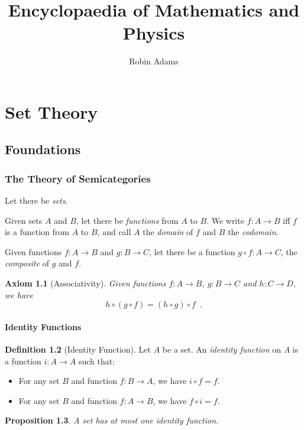 \documentclass{book}
\title{Encyclopaedia of Mathematics and Physics}
\author{Robin Adams}
\date{}
\newtheorem{prop}{Proposition}[chapter]
\newtheorem{ax}[prop]{Axiom}
\theoremstyle{definition}
\newtheorem{df}[prop]{Definition}
\begin{document}
\maketitle
\tableofcontents

\part{Set Theory}

\chapter{Foundations}

\section{The Theory of Semicategories}

Let there be \emph{sets}.

Given sets $A$ and $B$, let there be \emph{functions} from $A$ to $B$. We write $f : A \rightarrow B$ iff $f$ is a function from $A$ to $B$, and call $A$ the \emph{domain} of $f$ and $B$ the \emph{codomain}.

Given functions $f : A \rightarrow B$ and $g : B \rightarrow C$, let there be a function $g \circ f : A \rightarrow C$, the \emph{composite} of $g$ and $f$.

\begin{ax}[Associativity]
Given functions $f : A \rightarrow B$, $g : B \rightarrow C$ and $h : C \rightarrow D$, we have
\[ h \circ (g \circ f) = (h \circ g) \circ f \enspace . \]
\end{ax}

\subsection{Identity Functions}

\begin{df}[Identity Function]
Let $A$ be a set. An \emph{identity function} on $A$ is a function $i : A \rightarrow A$ such that:
\begin{itemize}
\item For any set $B$ and function $f : B \rightarrow A$, we have $i \circ f = f$.
\item For any set $B$ and function $f : A \rightarrow B$, we have $f \circ i = f$.
\end{itemize}
\end{df}

\begin{prop}
A set has at most one identity function.
\end{prop}
\end{document}
